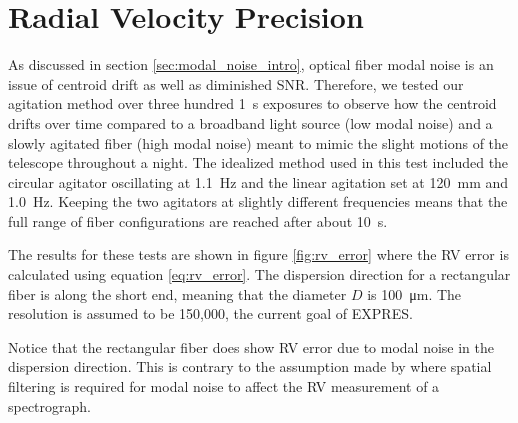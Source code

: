 \documentclass[twocolumn]{emulateapj}
\begin{document}
\section{Radial Velocity Precision}
\label{sec:rv_precision}

As discussed in section \ref{sec:modal_noise_intro}, optical fiber modal noise is an issue of centroid drift as well as diminished SNR. Therefore, we tested our agitation method over three hundred \SI{1}{\second} exposures to observe how the centroid drifts over time compared to a broadband light source (low modal noise) and a slowly agitated fiber (high modal noise) meant to mimic the slight motions of the telescope throughout a night. The idealized method used in this test included the circular agitator oscillating at \SI{1.1}{\hertz} and the linear agitation set at \SI{120}{\milli\meter} and \SI{1.0}{\hertz}. Keeping the two agitators at slightly different frequencies means that the full range of fiber configurations are reached after about \SI{10}{\second}.

The results for these tests are shown in figure \ref{fig:rv_error} where the RV error is calculated using equation \ref{eq:rv_error}. The dispersion direction for a rectangular fiber is along the short end, meaning that the diameter $D$ is \SI{100}{\micro\meter}. The resolution is assumed to be 150,000, the current goal of EXPRES.

Notice that the rectangular fiber does show RV error due to modal noise in the dispersion direction. This is contrary to the assumption made by \cite{Epworth1978} where spatial filtering is required for modal noise to affect the RV measurement of a spectrograph.
\end{document}
